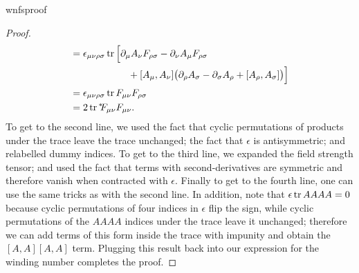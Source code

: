 \begin{proposition}{}{wnfsproof}
\begin{proof}
\begin{equation*}
\begin{aligned}
       &=\epsilon_{\mu\nu\rho\sigma}\tr\Big[\partial_\mu A_\nu F_{\rho\sigma}
           -\partial_\nu A_\mu F_{\rho\sigma}\\
           &~~~~~~~~~~~~~~~~~~+[A_\mu,A_\nu]
                    \big(\partial_\rho A_\sigma-\partial_\sigma A_\rho
                          +[A_\rho,A_\sigma]\big)\Big]\\
       &=\epsilon_{\mu\nu\rho\sigma}\tr F_{\mu\nu}F_{\rho\sigma}\\
       &=2\tr \dual{F_{\mu\nu}}F_{\mu\nu}.
    \end{aligned}
    \end{equation*}
   To get to the second line, we used the fact that cyclic permutations
    of products under the trace leave the trace unchanged; the fact that
    $\epsilon$ is antisymmetric; and relabelled dummy indices. To get to
    the third line, we expanded the field strength tensor; and used the fact
    that terms with second-derivatives are symmetric and therefore vanish
    when contracted with $\epsilon$. Finally to get to the fourth line,
    one can use the same tricks as with the second line. In addition,
    note that $\epsilon\tr AAAA=0$ because cyclic permutations of
    four indices in $\epsilon$ flip the sign, while cyclic permutations
    of the $AAAA$ indices under the trace leave it unchanged; therefore
    we can add terms of this form inside the trace with impunity
    and obtain the $[A,A][A,A]$ term.
    Plugging this result back into our expression for the winding number
    completes the proof.
  \end{proof}
\end{proposition}

